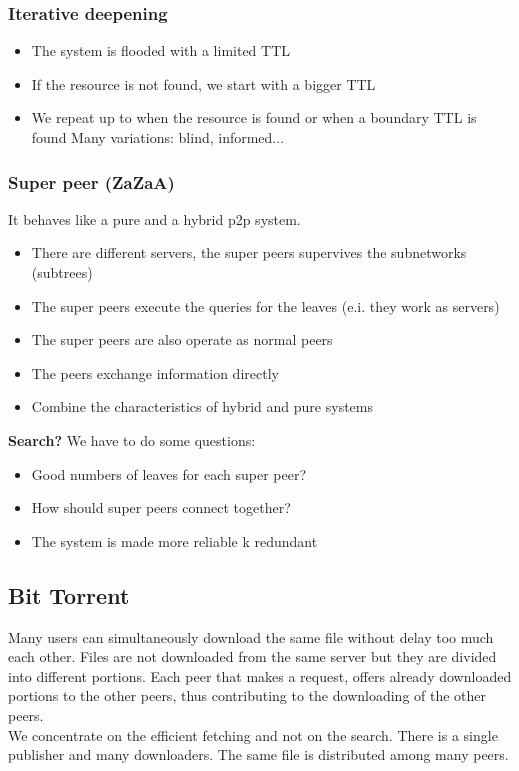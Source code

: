 \documentclass[paper=a4, fontsize=11pt]{scrartcl} %
\numberwithin{equation}{section} %
\numberwithin{figure}{section} %
\numberwithin{table}{section} %
\begin{document}
\subsubsection*{Iterative deepening}
\begin{itemize}
\item The system is flooded with a limited TTL
\item If the resource is not found, we start with a bigger TTL
\item We repeat up to when the resource is found or when a boundary TTL is found
Many variations: blind, informed...
\end{itemize}
\newpage
\subsubsection*{Super peer (ZaZaA)}
It behaves like a pure and a hybrid p2p system.
\begin{itemize}
\item There are different servers, the super peers supervives the subnetworks (subtrees)
\item The super peers execute the queries for the leaves (e.i. they work as servers)
\item The super peers are also operate as normal peers
\item The peers exchange information directly
\item Combine the characteristics of hybrid and pure systems
\end{itemize}
\textbf{Search?} We have to do some questions:
\begin{itemize}
\item Good numbers  of leaves for each super peer?
\item How should super peers connect together?
\item The system is made more reliable k redundant
\end{itemize}
\subsection*{Bit Torrent}
Many users can simultaneously download the same file without delay too much each other. Files are not downloaded from the same server but they are divided into different portions. Each peer that makes a request, offers already downloaded portions to the other peers, thus contributing to the downloading of the other peers.\\
We concentrate on the efficient fetching and not on the search. There is a single publisher and many downloaders. The same file is distributed among many peers. 
\end{document}
